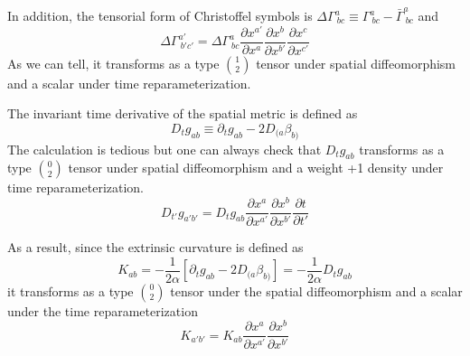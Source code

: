 \documentclass[letterpaper,nofootinbib,prd,amsmath,onecolumn]{revtex4-1}
\begin{document}
In addition, the tensorial form of Christoffel symbols is $\Delta \Gamma^{a}_{~bc} \equiv \Gamma^{a}_{~bc} - {\bar \Gamma}^{a}_{~bc}$ and
\begin{equation}
\Delta \Gamma^{a'}_{~b'c'} = \Delta \Gamma^{a}_{~bc}\frac{\partial x^{a'}}{\partial x^{a}}\frac{\partial x^{b}}{\partial x^{b'}}\frac{\partial x^{c}}{\partial x^{c'}}
\end{equation}
As we can tell, it transforms as a type $1 \choose 2$ tensor under spatial diffeomorphism and a scalar under time reparameterization. 

The invariant time derivative of the spatial metric is defined as
\begin{equation}
D_{t}g_{ab} \equiv \partial_{t}g_{ab} - 2D_{(a}\beta_{b)}
\end{equation}
The calculation is tedious but one can always check that $D_{t}g_{ab}$ transforms as a type $0 \choose 2$ tensor under spatial diffeomorphism and a weight +1 density under time reparameterization. 
\begin{equation}
D_{t'}g_{a'b'} = D_{t}g_{ab}\frac{\partial x^{a}}{\partial x^{a'}}\frac{\partial x^{b}}{\partial x^{b'}}\frac{\partial t}{\partial t'}
\end{equation}

As a result, since the extrinsic curvature is defined as
\begin{equation}
K_{ab} = -\frac{1}{2\alpha}[\partial_{t}g_{ab} - 2D_{(a}\beta_{b)}] = -\frac{1}{2\alpha}D_{t}g_{ab}
\end{equation}
it transforms as a type $0 \choose 2$ tensor under the spatial diffeomorphism and a scalar under the time reparameterization
\begin{equation}
K_{a'b'} = K_{ab}\frac{\partial x^{a}}{\partial x^{a'}}\frac{\partial x^{b}}{\partial x^{b'}}
\end{equation}
\end{document}
